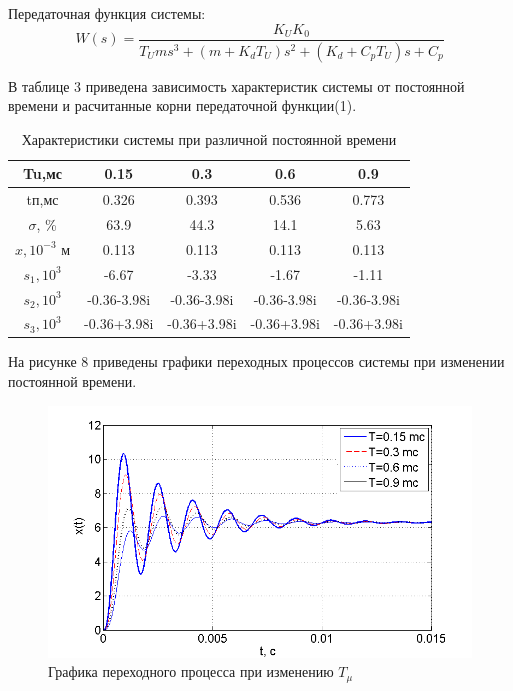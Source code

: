 \documentclass[a4paper, 12pt]{article}
\renewcommand{\arraystretch}{1.5}
\begin{document}
Передаточная функция системы:\\
\begin{equation}
W(s)=\frac{K_UK_0}{T_Ums^3+(m+K_dT_U)s^2+(K_d+C_pT_U)s+C_p}
\end{equation}\par
В таблице 3 приведена зависимость характеристик системы от постоянной времени и расчитанные корни передаточной функции(1). 
  
\begin{table}[h!]
	\begin{threeparttable}
\caption{Характеристики системы при различной постоянной времени  }
\renewcommand{\arraystretch}{1}
\renewcommand{\tabcolsep}{0.75cm}
\begin{tabular}{|c|c|c|c|c|}
	\hline
	Tu,мс	&	0.15	&	0.3	&	0.6	&	0.9	\\
	\hline
	tп,мс	&	0.326	&	0.393	&	0.536	&	0.773	\\
	\hline
	$\sigma$, \%	&	63.9	&	44.3	&	14.1	&	5.63	\\
	\hline
	$x,10^{-3} \text{ м}$	&	0.113	&	0.113	&	0.113	&	0.113	\\
	\hline
	$s_1, 10^{3}$	&	-6.67	&	-3.33	&	-1.67	&	-1.11	\\
	\hline
	$s_2, 10^{3}$	&	-0.36-3.98i	&	-0.36-3.98i	&	-0.36-3.98i	&	-0.36-3.98i	\\
	\hline
	$s_3, 10^{3}$	&	-0.36+3.98i	&	-0.36+3.98i	&	-0.36+3.98i	&	-0.36+3.98i	\\
	\hline
\end{tabular}
\end{threeparttable}
\end{table}\par

На рисунке 8 приведены графики переходных процессов системы при изменении постоянной времени.
\begin{figure}[h]
	\centering
	\includegraphics[width=0.7\linewidth]{8}
	\caption{Графика переходного процесса при изменению $T_{\mu}$}
	\label{}
\end{figure}
\end{document}
